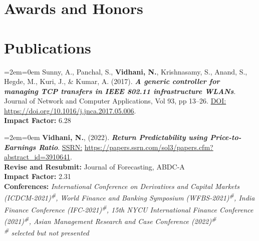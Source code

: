 \documentclass[11pt,a4paper,]{moderncv}
\begin{document}
\hypertarget{awards-and-honors}{%
\section{Awards and Honors}\label{awards-and-honors}}

\nopagebreak

\newpage

\hypertarget{publications}{%
\section{Publications}\label{publications}}

\begingroup
\setlength{\parindent}{-0.5in}
\setlength{\leftskip}{0.5in}

\bgroup %
  \par%
  \medskip
  \leftskip=2em\rightskip=0em%
  \noindent\ignorespaces
Sunny, A., Panchal, S., \textbf{Vidhani, N.}, Krishnasamy, S., Anand, S., Hegde, M., Kuri, J., \& Kumar, A. (2017). \textbf{\textit{A generic controller for managing TCP transfers in IEEE 802.11 infrastructure WLANs}}. Journal of Network and Computer Applications, Vol 93, pp 13--26. \underline{DOI:} \url{https://doi.org/10.1016/j.jnca.2017.05.006}.\\
\textbf{Impact Factor:} 6.28\\
%
  \par\medskip\egroup

\bgroup %
  \par%
  \medskip
  \leftskip=2em\rightskip=0em%
  \noindent\ignorespaces
\textbf{Vidhani, N.}, (2022). \textbf{\textit{Return Predictability using
Price-to-Earnings Ratio}}. \underline{SSRN:} \url{https://papers.ssrn.com/sol3/papers.cfm?abstract_id=3910641}.\\
\textbf{Revise and Resubmit:} Journal of Forecasting, ABDC-A\\
\textbf{Impact Factor:} 2.31\\
\textbf{Conferences:} \textit{International Conference on Derivatives and Capital Markets (ICDCM-2021)\textsuperscript{\#}, World Finance and Banking Symposium (WFBS-2021)\textsuperscript{\#}, India Finance Conference (IFC-2021)\textsuperscript{\#}, 15th NYCU International Finance Conference (2021)\textsuperscript{\#}, Asian Management Research and Case Conference (2022)\textsuperscript{\#}}\\
\textit{\textsuperscript{\#} selected but not presented}\\
%
  \par\medskip\egroup
\end{document}
